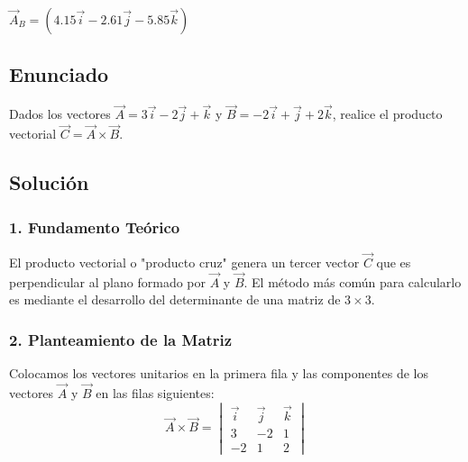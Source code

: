 \documentclass[12pt, a4paper]{article}
\begin{document}
\begin{tcolorbox}[colback=green!5!white, colframe=green!50!black, title=Respuesta Final]
\centering \Large $\vec{A}_B = (4.15\vec{i} - 2.61\vec{j} - 5.85\vec{k})$
\end{tcolorbox}

\newpage

\subsection*{Enunciado}
Dados los vectores $\vec{A} = 3\vec{i} - 2\vec{j} + \vec{k}$ y $\vec{B} = -2\vec{i} + \vec{j} + 2\vec{k}$, realice el producto vectorial $\vec{C} = \vec{A} \times \vec{B}$.

\begin{center}
\end{center}

\subsection*{Solución}

\subsubsection*{1. Fundamento Teórico}
El producto vectorial o "producto cruz" genera un tercer vector $\vec{C}$ que es perpendicular al plano formado por $\vec{A}$ y $\vec{B}$. El método más común para calcularlo es mediante el desarrollo del determinante de una matriz de $3 \times 3$.

\subsubsection*{2. Planteamiento de la Matriz}
Colocamos los vectores unitarios en la primera fila y las componentes de los vectores $\vec{A}$ y $\vec{B}$ en las filas siguientes:
\begin{equation*}
\vec{A} \times \vec{B} = \begin{vmatrix} 
\vec{i} & \vec{j} & \vec{k} \\ 
3 & -2 & 1 \\ 
-2 & 1 & 2 
\end{vmatrix}
\end{equation*}
\end{document}
